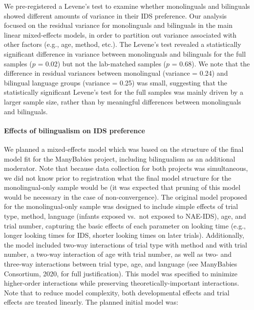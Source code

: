 \documentclass[
  english,
  ,man,floatsintext]{apa6}
\let\oldparagraph\paragraph
\renewcommand{\paragraph}[1]{\oldparagraph{#1}\mbox{}}
\begin{document}
We pre-registered a Levene's test to examine whether monolinguals and bilinguals showed different amounts of variance in their IDS preference. Our analysis focused on the residual variance for monolinguals and bilinguals in the main linear mixed-effects models, in order to partition out variance associated with other factors (e.g., age, method, etc.). The Levene's test revealed a statistically significant difference in variance between monolinguals and bilinguals for the full samples (\(p\) = 0.02) but not the lab-matched samples (\(p\) = 0.68). We note that the difference in residual variances between monolingual (variance = 0.24) and bilingual language groups (variance = 0.25) was small, suggesting that the statistically significant Levene's test for the full samples was mainly driven by a larger sample size, rather than by meaningful differences between monolinguals and bilinguals.

\hypertarget{effects-of-bilingualism-on-ids-preference}{%
\paragraph{Effects of bilingualism on IDS preference}\label{effects-of-bilingualism-on-ids-preference}}

We planned a mixed-effects model which was based on the structure of the final model fit for the ManyBabies project, including bilingualism as an additional moderator. Note that because data collection for both projects was simultaneous, we did not know prior to registration what the final model structure for the monolingual-only sample would be (it was expected that pruning of this model would be necessary in the case of non-convergence). The original model proposed for the monolingual-only sample was designed to include simple effects of trial type, method, language (infants exposed vs.~not exposed to NAE-IDS), age, and trial number, capturing the basic effects of each parameter on looking time (e.g., longer looking times for IDS, shorter looking times on later trials). Additionally, the model included two-way interactions of trial type with method and with trial number, a two-way interaction of age with trial number, as well as two- and three-way interactions between trial type, age, and language (see ManyBabies Consortium, 2020, for full justification). This model was specified to minimize higher-order interactions while preserving theoretically-important interactions. Note that to reduce model complexity, both developmental effects and trial effects are treated linearly. The planned initial model was:
\end{document}
